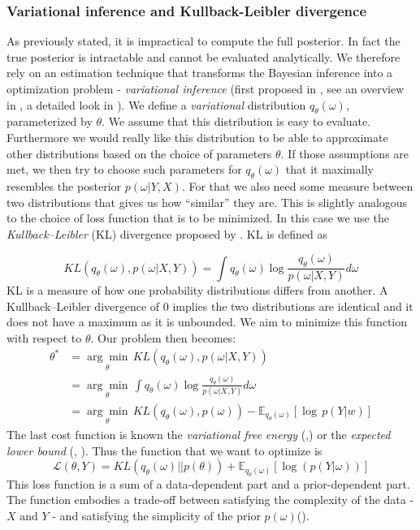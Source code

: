 \documentclass[12pt,a4paper,twoside]{scrartcl}
\numberwithin{equation}{section}
\begin{document}
\subsubsection{Variational inference and Kullback-Leibler divergence}\label{sec:var-inference}
As previously stated, it is impractical to compute the full posterior. In fact the true posterior is intractable and cannot be evaluated analytically. We therefore rely on an estimation technique that transforms the Bayesian inference into a optimization problem - \emph{variational inference} (first proposed in \cite{jordan1999}, see an overview in \cite{blei2016}, a detailed look in \cite{fox2012}). We define a \emph{variational} distribution \(q_{\theta}(\omega)\), parameterized by \(\theta \). We assume that this distribution is easy to evaluate. Furthermore we would really like this distribution to be able to approximate other distributions based on the choice of parameters \(\theta\). If those assumptions are met, we then try to choose such parameters for \(q_{\theta}(\omega)\) that it maximally resembles the posterior \(p(\omega|Y,X)\). For that we also need some measure between two distributions that gives us how ``similar'' they are. This is slightly analogous to the choice of loss function that is to be minimized. In this case we use the \emph{Kullback–Leibler} (KL) divergence proposed by \cite{kullback1951}. KL is defined as


\begin{equation}
  KL(q_{\theta}(\omega), p(\omega | X, Y)) = \int q_{\theta}(\omega) \log \frac{q_{\theta}(\omega)}{p(\omega | X, Y)}d\omega 
\end{equation}
KL is a measure of how one probability distributions differs from another. A Kullback–Leibler divergence of \(0\) implies the two distributions are identical and it does not have a maximum as it is unbounded. We aim to minimize this function with respect to \(\theta\). Our problem then becomes:
\begin{align}
  \theta^* &= \underset{\theta}{\arg\min} \,  KL(q_{\theta}(\omega), p(\omega | X, Y))\\
           &= \underset{\theta}{\arg\min}\, \int q_{\theta}(\omega) \log \frac{q_{\theta}(\omega)}{p(\omega | X, Y)}d\omega \\
           & = \underset{\theta}{\arg\min}\,  KL(q_{\theta}(\omega), p(\omega)) - \mathbb{E}_{q_{\theta}(\omega)}[\log\, p(Y|w)]
\end{align}
The last cost function is known the \emph{variational free energy} (\cite{neal1998},\cite{blundell2015}) or the \emph{expected lower bound} (\cite{fox2012}, \cite{saul1996}). Thus the function that we want to optimize is
\begin{equation}
  \mathcal{L}(\theta, Y) = KL(q_{\theta}(\omega)||p(\theta)) + \mathbb{E}_{q_{\theta}(\omega)}[\log(p(Y|\omega))]
\end{equation}
This loss function is a sum of a data-dependent part  and a prior-dependent part. The function embodies a trade-off between satisfying the complexity of the data - \(X \text{ and } Y \) - and satisfying the simplicity of the prior \(p(\omega)\)(\cite{blundell2015}).
\end{document}
